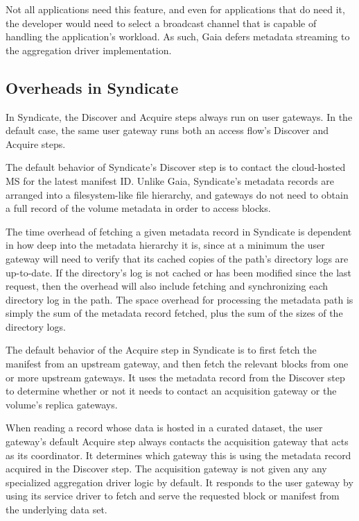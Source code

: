Not all applications need this feature, and even for applications that do need
it, the developer would need to select a broadcast channel that is capable of
handling the application's workload.  As such, Gaia defers
metadata streaming to the aggregation driver implementation.

\subsection{Overheads in Syndicate}

In Syndicate, the Discover and Acquire steps always run on user gateways.
In the default case, the same user gateway runs both
an access flow's Discover and Acquire steps.

The default behavior of Syndicate's Discover step is to contact the
cloud-hosted MS for the latest manifest ID.  Unlike Gaia, Syndicate's
metadata records are arranged into a filesystem-like file hierarchy, and
gateways do not need to obtain a full record of the volume metadata in order to access
blocks.

The time overhead of fetching a given metadata record in Syndicate 
is dependent in how deep into the metadata
hierarchy it is, since at a minimum the user gateway will need to verify that
its cached copies of the path's directory logs are up-to-date.
If the directory's log is not cached or has been modified
since the last request, then the overhead will also include fetching and
synchronizing each directory log in the path.
The space overhead for processing the metadata path 
is simply the sum of the metadata record fetched, plus the
sum of the sizes of the directory logs.

The default behavior of the Acquire step in Syndicate is to first fetch the
manifest from an upstream gateway, and then fetch the relevant blocks from one
or more upstream gateways.  It uses the metadata record from the Discover step
to determine whether or not it needs to contact an acquisition gateway or the
volume's replica gateways.

When reading a record whose data is hosted in a curated dataset, the user
gateway's default Acquire step always contacts the acquisition gateway that
acts as its coordinator.  It determines which gateway this is using the metadata
record acquired in the Discover step.  The acquisition gateway is not given any
any specialized aggregation driver logic by default.  It responds to the user
gateway by using its service
driver to fetch and serve the requested block or manifest from the underlying
data set.

